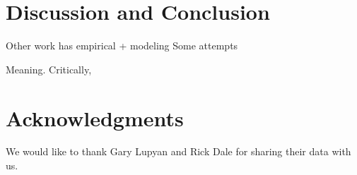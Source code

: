 \documentclass[10pt,letterpaper]{article}
\newcommand{\squeezeup}{\vspace{-1.5mm}}
\begin{document}
\section{Discussion and Conclusion}

 Other work has empirical + modeling
Some attempts
\cite{silvey2015word}
\cite{perfors2011language}




\cite{wichmann2011phonological}
\cite{wichmann2008languagephonological}
\cite{smith2010eliminating}
\cite{slobin1982children}

\cite{sapir1912language}
\cite{reali2014paradox}


\cite{lupyanrole}\cite{lupyan2010language}
\cite{kirby2008cumulative}
Meaning. \cite{silvey2015word}
\cite{perfors2011language}
Critically, 





\section{Acknowledgments}
We would like to thank Gary Lupyan and Rick Dale for sharing their data with us.




\setlength{\bibleftmargin}{.125in}
\setlength{\bibindent}{-\bibleftmargin}


\end{document}
